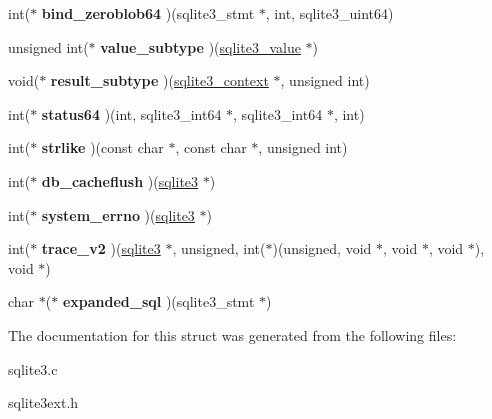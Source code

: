 \begin{DoxyCompactItemize}
\item 
int($\ast$ {\bfseries bind\+\_\+zeroblob64} )(sqlite3\+\_\+stmt $\ast$, int, sqlite3\+\_\+uint64)\hypertarget{structsqlite3__api__routines_a9fb795f050b41775676588e9c325f5d3}{}\label{structsqlite3__api__routines_a9fb795f050b41775676588e9c325f5d3}

\item 
unsigned int($\ast$ {\bfseries value\+\_\+subtype} )(\hyperlink{structMem}{sqlite3\+\_\+value} $\ast$)\hypertarget{structsqlite3__api__routines_aa73dd127586eb6cce223be7438661be7}{}\label{structsqlite3__api__routines_aa73dd127586eb6cce223be7438661be7}

\item 
void($\ast$ {\bfseries result\+\_\+subtype} )(\hyperlink{structsqlite3__context}{sqlite3\+\_\+context} $\ast$, unsigned int)\hypertarget{structsqlite3__api__routines_a452de7bcd3ff27aebfc1cf4a34125274}{}\label{structsqlite3__api__routines_a452de7bcd3ff27aebfc1cf4a34125274}

\item 
int($\ast$ {\bfseries status64} )(int, sqlite3\+\_\+int64 $\ast$, sqlite3\+\_\+int64 $\ast$, int)\hypertarget{structsqlite3__api__routines_a8e26258830d05f8a579bf8a46fdb95fd}{}\label{structsqlite3__api__routines_a8e26258830d05f8a579bf8a46fdb95fd}

\item 
int($\ast$ {\bfseries strlike} )(const char $\ast$, const char $\ast$, unsigned int)\hypertarget{structsqlite3__api__routines_a215ac857a5a0ddf91279973011a8245b}{}\label{structsqlite3__api__routines_a215ac857a5a0ddf91279973011a8245b}

\item 
int($\ast$ {\bfseries db\+\_\+cacheflush} )(\hyperlink{structsqlite3}{sqlite3} $\ast$)\hypertarget{structsqlite3__api__routines_ab971ab55e64914b6dc1ec0fdb357d9f5}{}\label{structsqlite3__api__routines_ab971ab55e64914b6dc1ec0fdb357d9f5}

\item 
int($\ast$ {\bfseries system\+\_\+errno} )(\hyperlink{structsqlite3}{sqlite3} $\ast$)\hypertarget{structsqlite3__api__routines_affc996e347835ac8ea395524d95897bd}{}\label{structsqlite3__api__routines_affc996e347835ac8ea395524d95897bd}

\item 
int($\ast$ {\bfseries trace\+\_\+v2} )(\hyperlink{structsqlite3}{sqlite3} $\ast$, unsigned, int($\ast$)(unsigned, void $\ast$, void $\ast$, void $\ast$), void $\ast$)\hypertarget{structsqlite3__api__routines_ab5bd1ea521d5bb44e4f78c7bb07aa068}{}\label{structsqlite3__api__routines_ab5bd1ea521d5bb44e4f78c7bb07aa068}

\item 
char $\ast$($\ast$ {\bfseries expanded\+\_\+sql} )(sqlite3\+\_\+stmt $\ast$)\hypertarget{structsqlite3__api__routines_abea33c37f0a4e1070b992fdc7d6c74d5}{}\label{structsqlite3__api__routines_abea33c37f0a4e1070b992fdc7d6c74d5}

\end{DoxyCompactItemize}


The documentation for this struct was generated from the following files\+:\begin{DoxyCompactItemize}
\item 
sqlite3.\+c\item 
sqlite3ext.\+h\end{DoxyCompactItemize}
